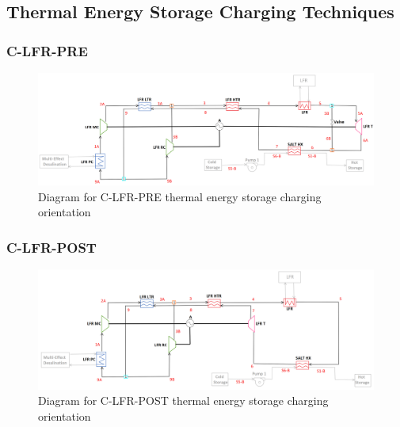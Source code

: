 \begin{paracol}{2}
\linenumbers
\switchcolumn

\subsection{Thermal Energy Storage Charging Techniques} %

\subsubsection{C-LFR-PRE} %
\end{paracol}
\begin{figure}[H]
    \widefigure
    \includegraphics[width=\linewidth]{Definitions/c-lfr-pre.pdf}
    \caption{Diagram for C-LFR-PRE thermal energy storage charging orientation\label{c-lfr-pre}}
\end{figure}
\begin{paracol}{2}
\linenumbers
\switchcolumn


\subsubsection{C-LFR-POST} %
\end{paracol}
\begin{figure}[H]
    \widefigure
    \includegraphics[width=\linewidth]{Definitions/c-lfr-post.pdf}
    \caption{Diagram for C-LFR-POST thermal energy storage charging orientation\label{c-lfr-post}}
\end{figure}
